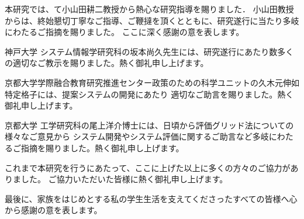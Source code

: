 \documentclass[syuuron]{kuee}
\begin{document}
\begin{acknowledgements}
	本研究では、て小山田耕二教授から熱心な研究指導を賜りました．
	小山田教授からは、終始懇切丁寧なご指導、ご鞭撻を頂くとともに、研究遂行に当たり多岐にわたるご指摘を賜りました。
	ここに深く感謝の意を表します。
	
	神戸大学 システム情報学研究科の坂本尚久先生には、研究遂行にあたり数多くの適切なご教示を賜りました。熱く御礼申し上げます。
	
	京都大学学際融合教育研究推進センター政策のための科学ユニットの久木元伸如特定格子には、提案システムの開発にあたり
	適切なご助言を賜りました。熱く御礼申し上げます。
	
	京都大学 工学研究科の尾上洋介博士には、日頃から評価グリッド法についての様々なご意見から
	システム開発やシステム評価に関するご助言など多岐にわたるご指摘を賜りました。熱く御礼申し上げます。
	
	これまで本研究を行うにあたって、ここに上げた以上に多くの方々のご協力がありました。
	ご協力いただいた皆様に熱く御礼申し上げます。
	
	最後に、家族をはじめとする私の学生生活を支えてくださったすべての皆様へ心から感謝の意を表します。
	
\end{acknowledgements}
\end{document}
